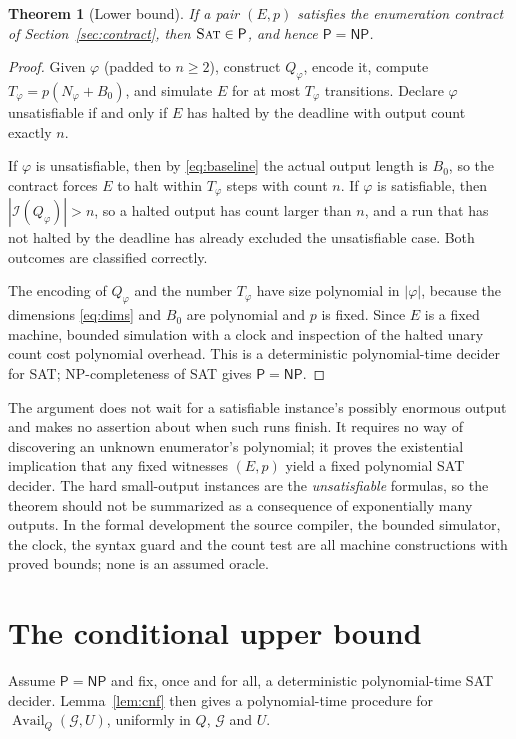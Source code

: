 \documentclass[11pt,a4paper]{article}
\theoremstyle{plain}
\newtheorem{theorem}{Theorem}[section]
\theoremstyle{definition}
\theoremstyle{remark}
\newcommand{\Irr}{\mathcal I}
\newcommand{\Avail}{\operatorname{Avail}}
\newcommand{\PP}{\mathsf P}
\newcommand{\NP}{\mathsf{NP}}
\newcommand{\SAT}{\textup{\textsc{Sat}}}
\newcommand{\cG}{\mathcal G}
\begin{document}
\begin{theorem}[Lower bound]\label{thm:lower}
If a pair $(E,p)$ satisfies the enumeration contract of Section~\ref{sec:contract}, then $\SAT\in\PP$, and hence $\PP=\NP$.
\end{theorem}
\begin{proof}
Given $\varphi$ (padded to $n\ge2$), construct $Q_\varphi$, encode it, compute $T_\varphi=p(N_\varphi+B_0)$, and simulate $E$ for at most $T_\varphi$ transitions. Declare $\varphi$ unsatisfiable if and only if $E$ has halted by the deadline with output count exactly $n$.

If $\varphi$ is unsatisfiable, then by \eqref{eq:baseline} the actual output length is $B_0$, so the contract forces $E$ to halt within $T_\varphi$ steps with count $n$. If $\varphi$ is satisfiable, then $|\Irr(Q_\varphi)|>n$, so a halted output has count larger than $n$, and a run that has not halted by the deadline has already excluded the unsatisfiable case. Both outcomes are classified correctly.

The encoding of $Q_\varphi$ and the number $T_\varphi$ have size polynomial in $|\varphi|$, because the dimensions \eqref{eq:dims} and $B_0$ are polynomial and $p$ is fixed. Since $E$ is a fixed machine, bounded simulation with a clock and inspection of the halted unary count cost polynomial overhead. This is a deterministic polynomial-time decider for SAT; NP-completeness of SAT \cite{cook1971complexity,levin1973universal,karp1972reducibility} gives $\PP=\NP$.
\end{proof}

The argument does not wait for a satisfiable instance's possibly enormous output and makes no assertion about when such runs finish. It requires no way of discovering an unknown enumerator's polynomial; it proves the existential implication that any fixed witnesses $(E,p)$ yield a fixed polynomial SAT decider. The hard small-output instances are the \emph{unsatisfiable} formulas, so the theorem should not be summarized as a consequence of exponentially many outputs. In the formal development the source compiler, the bounded simulator, the clock, the syntax guard and the count test are all machine constructions with proved bounds; none is an assumed oracle.

\section{The conditional upper bound}\label{sec:upper}

Assume $\PP=\NP$ and fix, once and for all, a deterministic polynomial-time SAT decider. Lemma~\ref{lem:cnf} then gives a polynomial-time procedure for $\Avail_Q(\cG,U)$, uniformly in $Q$, $\cG$ and $U$.
\end{document}
